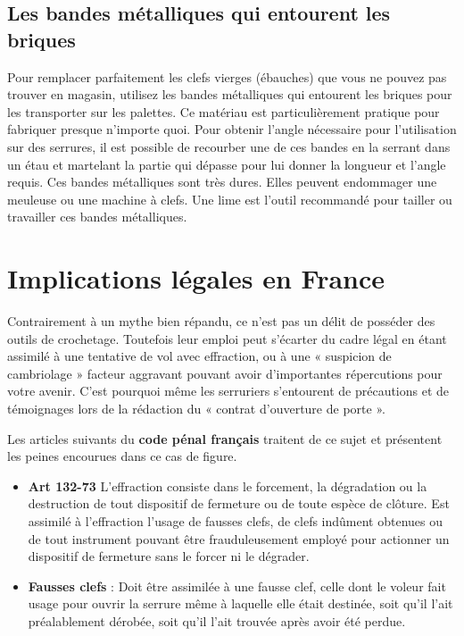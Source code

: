 \documentclass[a4paper,french,11pt,twoside]{report}
\begin{document}
\subsection{Les bandes métalliques qui entourent les briques}

Pour remplacer parfaitement les clefs vierges (ébauches) que vous ne pouvez pas trouver en magasin, utilisez les bandes métalliques qui entourent les briques pour les transporter sur les palettes. Ce matériau est particulièrement pratique pour fabriquer presque n'importe quoi. Pour obtenir l'angle nécessaire pour l'utilisation sur des serrures, il est possible de recourber une de ces bandes en la serrant dans un étau et martelant la partie qui dépasse pour lui donner la longueur et l'angle requis. Ces bandes métalliques sont très dures. Elles peuvent endommager une meuleuse ou une machine à clefs. Une lime est l'outil recommandé pour tailler ou travailler ces bandes métalliques.

\section{Implications légales en France}

Contrairement à un mythe bien répandu, ce n'est pas un délit de posséder des outils de crochetage. Toutefois leur emploi peut s'écarter du cadre légal en étant assimilé à une tentative de vol avec effraction, ou à une « suspicion de cambriolage » facteur aggravant pouvant avoir d'importantes répercutions pour votre avenir. C'est pourquoi même les serruriers s'entourent de précautions et de témoignages lors de la rédaction du « contrat d'ouverture de porte ».

Les articles suivants du \textbf{code pénal français} traitent de ce sujet et présentent les peines encourues dans ce cas de figure.

\begin{itemize}
\item{\textbf{Art 132-73} L'effraction consiste dans le forcement, la dégradation ou la destruction de tout dispositif de fermeture ou de toute espèce de clôture. Est assimilé à l'effraction l'usage de fausses clefs, de clefs indûment obtenues ou de tout instrument pouvant être frauduleusement employé pour actionner un dispositif de fermeture sans le forcer ni le dégrader.}
\item{\textbf{Fausses clefs} : Doit être assimilée à une fausse clef, celle dont le voleur fait usage pour ouvrir la serrure même à laquelle elle était destinée, soit qu'il l'ait préalablement dérobée, soit qu'il l'ait trouvée après avoir été perdue.}
\end{itemize}
\end{document}
